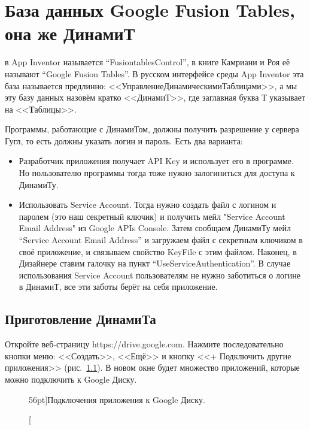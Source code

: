 \chapter{База данных Google Fusion Tables, она же ДинамиТ}
\label{ch:dynamite}


 в App Inventor называется ``FusiontablesControl'', 
в книге Камриани и Роя\cite{KamrianiAndRoy2016} её называют ``Google Fusion Tables''. 
В русском интерфейсе среды App Inventor эта база называется предлинно: 
<<УправлениеДинамическимиТаблицами>>, а мы эту базу данных назовём кратко <<ДинамиТ>>, 
где заглавная буква Т указывает на <<\textbf{Т}аблицы>>.

Программы, работающие с ДинамиТом, должны получить разрешение у сервера Гугл, то есть должны указать логин и пароль. Есть два варианта:
\begin{itemize}
    \item Разработчик приложения получает API Key и использует его в программе. 
        Но пользователю программы тогда тоже нужно залогиниться для доступа к ДинамиТу. 
    \item Использовать Service Account. Тогда нужно создать 
        файл с логином и паролем (это наш секретный ключик) и получить 
        мейл "Service Account Email Address" из Google APIs Console. 
        Затем сообщаем ДинамиТу мейл ``Service Account Email Address'' 
        и загружаем файл с секретным ключиком в своё приложение, 
        и связываем свойство KeyFile с этим файлом. 
        Наконец, в Дизайнере ставим галочку на пункт ``UseServiceAuthentication''. 
        В случае использования Service Account 
        пользователям не нужно заботиться о логине в ДинамиТ, 
        все эти заботы берёт на себя приложение.
\end{itemize}




\section{Приготовление ДинамиТа}


Откройте веб-страницу https://drive.google.com. Нажмите последовательно 
кнопки меню: <<Создать>>, <<Ещё>> и кнопку <<+ Подключить другие приложения>> 
(рис.~\ref{fig:google_drive_connect_more_apps}). В новом окне будет множество 
приложений, которые можно подключить к Google Диску. 

\begin{figure}
{%
\setlength{\fboxsep}{0pt}%
\setlength{\fboxrule}{1pt}%
%
}%
    \caption[Подключения приложения к Google Диску.][56pt]{Подключения 
            приложения к Google Диску.
    }
  \label{fig:google_drive_connect_more_apps}
\end{figure}

